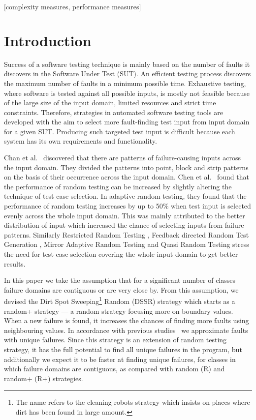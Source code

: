 \documentclass{acm_proc_article-sp}
\begin{document}
[complexity measures, performance measures]




\section{Introduction}\label{sec:intro}
Success of a software testing technique is mainly based on the number of faults it discovers in the Software Under Test (SUT). An efficient testing process discovers the maximum number of faults in a minimum possible time. Exhaustive testing, where software is tested against all possible inputs, is mostly not feasible because of the large size of the input domain, limited resources and strict time constraints. Therefore, strategies in automated software testing tools are developed with the aim to select more fault-finding test input from input domain for a given SUT. Producing such targeted test input is difficult because each system has its own requirements and functionality.

Chan et al.~\cite{Chan1996} discovered that there are patterns of failure-causing inputs across the input domain. They divided the patterns into point, block and strip patterns on the basis of their occurrence across the input domain. Chen et al.~\cite{Chen2008} found that the performance of random testing can be increased by slightly altering the technique of test case selection. In adaptive random testing, they found that the performance of random testing increases by up to 50\% when test input is selected evenly across the whole input domain. This was mainly attributed to the better distribution of input which increased the chance of selecting inputs from failure patterns. Similarly Restricted Random Testing \cite{Chan2002}, Feedback directed Random Test Generation \cite{Pacheco2007a}, Mirror Adaptive Random Testing \cite{Chen2003} and Quasi Random Testing \cite{Chen2005} stress the need for test case selection covering the whole input domain to get better results.

In this paper we take the assumption that for a significant number of classes failure domains are contiguous or are very close by. From this assumption, we devised the Dirt Spot Sweeping\footnote{The name refers to the cleaning robots strategy which insists on places where dirt has been found in large amount.} Random (DSSR) strategy  which starts as a random+ strategy --- a random strategy focusing more on boundary values. When a new failure is found, it increases the chances of finding more faults using neighbouring values. In accordance with previous studies~\cite{Oriol2012} we approximate faults with unique failures. Since this strategy is an extension of random testing strategy, it has the full potential to find all unique failures in the program, but additionally we expect it to be faster at finding unique failures, for classes in which failure domains are contiguous, as compared with random (R) and random+ (R+) strategies.
\end{document}
